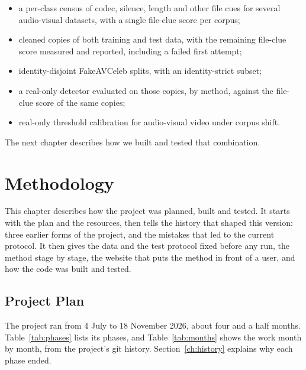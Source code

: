 \begin{itemize}
    \item a per-class census of codec, silence, length and other file cues for
    several audio-visual datasets, with a single file-clue score per corpus;
    \item cleaned copies of both training and test data, with the remaining
    file-clue score measured and reported, including a failed first attempt;
    \item identity-disjoint FakeAVCeleb splits, with an identity-strict subset;
    \item a real-only detector evaluated on those copies, by method, against
    the file-clue score of the same copies;
    \item real-only threshold calibration for audio-visual video under corpus
    shift.
\end{itemize}

The next chapter describes how we built and tested that combination.

%
\chapter{Methodology}
\label{ch:methodology}

This chapter describes how the project was planned, built and tested. It
starts with the plan and the resources, then tells the history that shaped
this version: three earlier forms of the project, and the mistakes that led to
the current protocol. It then gives the data and the test protocol fixed
before any run, the method stage by stage, the website that puts the method
in front of a user, and how the code was built and tested.

\section{Project Plan}
\label{sec:m-plan}

The project ran from 4 July to 18 November 2026, about four and a half
months. Table~\ref{tab:phases} lists its phases, and
Table~\ref{tab:months} shows the work month by month, from the project's git
history. Section~\ref{ch:history} explains why each phase ended.

